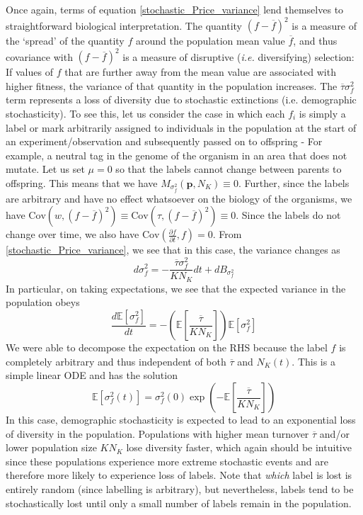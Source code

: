 Once again, terms of equation \eqref{stochastic_Price_variance} lend themselves to straightforward biological interpretation. The quantity $(f-\overline{f})^2$ is a measure of the `spread' of the quantity $f$ around the population mean value $\overline{f}$, and thus covariance with $(f-\overline{f})^2$ is a measure of disruptive (\emph{i.e.} diversifying) selection: If values of $f$ that are further away from the mean value are associated with higher fitness, the variance of that quantity in the population increases. The $\overline{\tau}\sigma^2_{f}$ term represents a loss of diversity due to stochastic extinctions (i.e. demographic stochasticity). To see this, let us consider the case in which each $f_i$ is simply a label or mark arbitrarily assigned to individuals in the population at the start of an experiment/observation and subsequently passed on to offspring - For example, a neutral tag in the genome of the organism in an area that does not mutate. Let us set $\mu = 0$ so that the labels cannot change between parents to offspring. This means that we have $M_{\sigma^2_f}(\mathbf{p},N_K) \equiv 0$. Further, since the labels are arbitrary and have no effect whatsoever on the biology of the organisms, we have $\textrm{Cov}\left(w,(f - \overline{f})^2\right) \equiv \textrm{Cov}\left(\tau,(f - \overline{f})^2\right) \equiv 0$. Since the labels do not change over time, we also have $\textrm{Cov}\left(\frac{\partial f}{\partial t},f\right) = 0$. From \eqref{stochastic_Price_variance}, we see that in this case, the variance changes as
\begin{equation}
d\sigma^2_f = - \frac{\overline{\tau}\sigma^2_{f}}{KN_K}dt + dB_{\sigma^2_{f}}
\end{equation}
In particular, on taking expectations, we see that the expected variance in the population obeys
\begin{equation}
\frac{d \mathbb{E}[\sigma^2_f]}{dt} = - \left(\mathbb{E}\left[\frac{\overline{\tau}}{KN_K}\right]\right)\mathbb{E}[\sigma^2_{f}]
\end{equation}
We were able to decompose the expectation on the RHS because the label $f$ is completely arbitrary and thus independent of both $\overline{\tau}$ and $N_K(t)$. This is a simple linear ODE and has the solution
\begin{equation}
\mathbb{E}[\sigma^2_f(t)] = \sigma^2_f(0)\exp\left(-\mathbb{E}\left[\frac{\overline{\tau}}{KN_K}\right]\right)
\end{equation}
In this case, demographic stochasticity is expected to lead to an exponential loss of diversity in the population. Populations with higher mean turnover $\overline{\tau}$  and/or lower population size $KN_K$ lose diversity faster, which again should be intuitive since these populations experience more extreme stochastic events and are therefore more likely to experience loss of labels. Note that \emph{which} label is lost is entirely random (since labelling is arbitrary), but nevertheless, labels tend to be stochastically lost until only a small number of labels remain in the population.